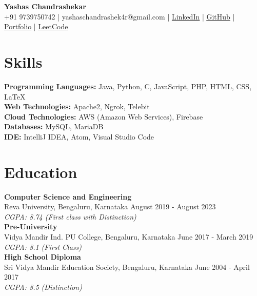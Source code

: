\documentclass[a4paper,8pt]{article}
\begin{document}
\pagestyle{empty}

\begin{center}
    \textbf{\LARGE Yashas Chandrashekar} \\
    \vspace{2mm}
    +91 9739750742 | yashaschandrashek4r@gmail.com | \href{https://linkedin.com/in/yashaschandrashekar}{\underline{LinkedIn}} | \href{https://github.com/yashasc2k1}{\underline{GitHub}} | \href{https://yashasc2k1.github.io/YashasChandrashekar/}{\underline{Portfolio}} | \href{https://leetcode.com/YashasC/}{\underline{LeetCode}}
\end{center}




\section*{Skills}
\textbf{Programming Languages:}
Java, Python, C, JavaScript, PHP, HTML, CSS, \LaTeX \\
\textbf{Web Technologies:}
Apache2, Ngrok, Telebit\\
\textbf{Cloud Technologies:}
AWS (Amazon Web Services), Firebase\\
\textbf{Databases:}
MySQL, MariaDB\\
\textbf{IDE:}
IntelliJ IDEA, Atom, Visual Studio Code



\section*{Education}
\textbf{Computer Science and Engineering} \\
Reva University, Bengaluru, Karnataka \hfill August 2019 - August 2023 \\
\textit{CGPA: 8.74 (First class with Distinction)} \\
\textbf{Pre-University} \\
Vidya Mandir Ind. PU College, Bengaluru, Karnataka \hfill June 2017 - March 2019 \\
\textit{CGPA: 8.1 (First Class)} \\
\textbf{High School Diploma} \\
Sri Vidya Mandir Education Society, Bengaluru, Karnataka \hfill June 2004 - April 2017 \\
\textit{CGPA: 8.5 (Distinction)}



\end{document}
